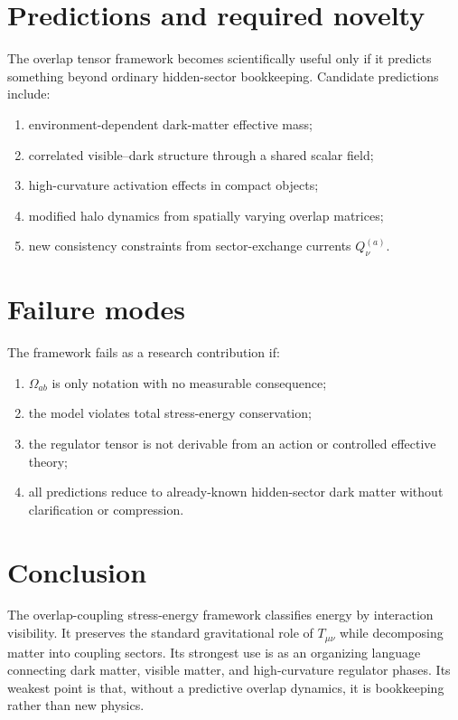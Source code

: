 \documentclass[11pt]{article}
\theoremstyle{remark}
\begin{document}
\section{Predictions and required novelty}
The overlap tensor framework becomes scientifically useful only if it predicts something beyond ordinary hidden-sector bookkeeping. Candidate predictions include:
\begin{enumerate}[leftmargin=2em]
    \item environment-dependent dark-matter effective mass;
    \item correlated visible--dark structure through a shared scalar field;
    \item high-curvature activation effects in compact objects;
    \item modified halo dynamics from spatially varying overlap matrices;
    \item new consistency constraints from sector-exchange currents $Q^{(a)}_\nu$.
\end{enumerate}

\section{Failure modes}
The framework fails as a research contribution if:
\begin{enumerate}[leftmargin=2em]
    \item $\Omega_{ab}$ is only notation with no measurable consequence;
    \item the model violates total stress-energy conservation;
    \item the regulator tensor is not derivable from an action or controlled effective theory;
    \item all predictions reduce to already-known hidden-sector dark matter without clarification or compression.
\end{enumerate}

\section{Conclusion}
The overlap-coupling stress-energy framework classifies energy by interaction visibility. It preserves the standard gravitational role of $T_{\mu\nu}$ while decomposing matter into coupling sectors. Its strongest use is as an organizing language connecting dark matter, visible matter, and high-curvature regulator phases. Its weakest point is that, without a predictive overlap dynamics, it is bookkeeping rather than new physics.
\end{document}
